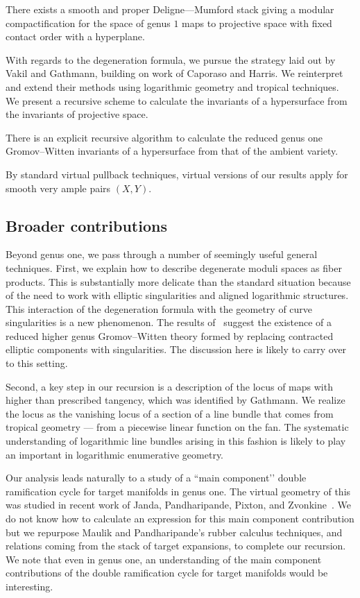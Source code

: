 \documentclass[11pt]{amsart}
\theoremstyle{definition}
\newenvironment{customthm}[1]
  {\renewcommand\theinnercustomthm{#1}\innercustomthm}
  {\endinnercustomthm}
\theoremstyle{definition}
\begin{document}
\begin{customthm}{A}
There exists a smooth and proper Deligne—Mumford stack giving a modular compactification for the space of genus $1$ maps to projective space with fixed contact order with a hyperplane. 
\end{customthm}

With regards to the degeneration formula, we pursue the strategy laid out by Vakil and Gathmann, building on work of Caporaso and Harris. We reinterpret and extend their methods using logarithmic geometry and tropical techniques. We present a recursive scheme to calculate the invariants of a hypersurface from the invariants of projective space. 

\begin{customthm}{B}
There is an explicit recursive algorithm to calculate the reduced genus one Gromov--Witten invariants of a hypersurface from that of the ambient variety. 
\end{customthm}

By standard virtual pullback techniques, virtual versions of our results apply for smooth very ample pairs $(X,Y)$.

\subsection{Broader contributions} Beyond genus one, we pass through a number of seemingly useful general techniques. First, we explain how to describe degenerate moduli spaces as fiber products. This is substantially more delicate than the standard situation because of the need to work with elliptic singularities and aligned logarithmic structures. This interaction of the degeneration formula with the geometry of curve singularities is a new phenomenon. The results of~\cite{RSPW} suggest the existence of a reduced higher genus Gromov--Witten theory formed by replacing contracted elliptic components with singularities. The discussion here is likely to carry over to this setting.

Second, a key step in our recursion is a description of the locus of maps with higher than prescribed tangency, which was identified by Gathmann. We realize the locus as the vanishing locus of a section of a line bundle that comes from tropical geometry — from a piecewise linear function on the fan. The systematic understanding of logarithmic line bundles arising in this fashion is likely to play an important in logarithmic enumerative geometry.

Our analysis leads naturally to a study of a ``main component’’ double ramification cycle for target manifolds in genus one. The virtual geometry of this was studied in recent work of Janda, Pandharipande, Pixton, and Zvonkine~\cite{DRCBundle}. We do not know how to calculate an expression for this main component contribution but we repurpose Maulik and Pandharipande’s rubber calculus techniques, and relations coming from the stack of target expansions, to complete our recursion. We note that even in genus one, an understanding of the main component contributions of the double ramification cycle for target manifolds would be interesting.
\end{document}

